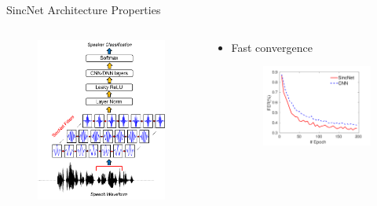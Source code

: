 \documentclass[notheorems, aspectratio=54]{beamer}
\begin{document}
\begin{frame}{SincNet Architecture Properties}
	\begin{columns}
		\begin{column}{0.47\textwidth}
			\begin{figure}[H]
				\includegraphics[width=0.9\linewidth]{images/SincNet.png}
			\end{figure}
		\end{column}
		\begin{column}{0.5\textwidth}
			\begin{itemize}
				\item Fast convergence
				\begin{figure}[H]
					\includegraphics[width=0.9\linewidth]{images/fast_convergence.png}
				\end{figure}
			\end{itemize}
		\end{column}
	\end{columns}
\end{frame}
\end{document}
